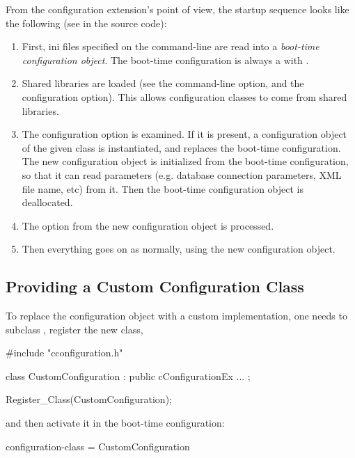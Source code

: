 From the configuration extension's point of view, the startup sequence
looks like the following (see  in the source code):

\begin{enumerate}
  \item First, ini files specified on the command-line are read into a
     \textit{boot-time configuration object}. The boot-time configuration
     is always a  with
     .
  \item Shared libraries are loaded (see the  command-line option,
     and the  configuration option). This allows
     configuration classes to come from shared libraries.
  \item The  configuration option is examined.
     If it is present, a configuration object of the given class
     is instantiated, and replaces the boot-time configuration.
     The new configuration object is initialized from the boot-time
     configuration, so that it can read parameters (e.g. database
     connection parameters, XML file name, etc) from it.
     Then the boot-time configuration object is deallocated.
  \item The  option from the new configuration object is
     processed.
  \item Then everything goes on as normally, using the new configuration
     object.
\end{enumerate}

\subsection{Providing a Custom Configuration Class}
\label{sec:plugin-exts:configprovider:custom-class}

To replace the configuration object with a custom implementation,
one needs to subclass , register the new class,

\begin{cpp}
#include "cconfiguration.h"

class CustomConfiguration : public cConfigurationEx
{
   ...
};

Register_Class(CustomConfiguration);
\end{cpp}

and then activate it in the boot-time configuration:

\begin{inifile}
[General]
configuration-class = CustomConfiguration
\end{inifile}


